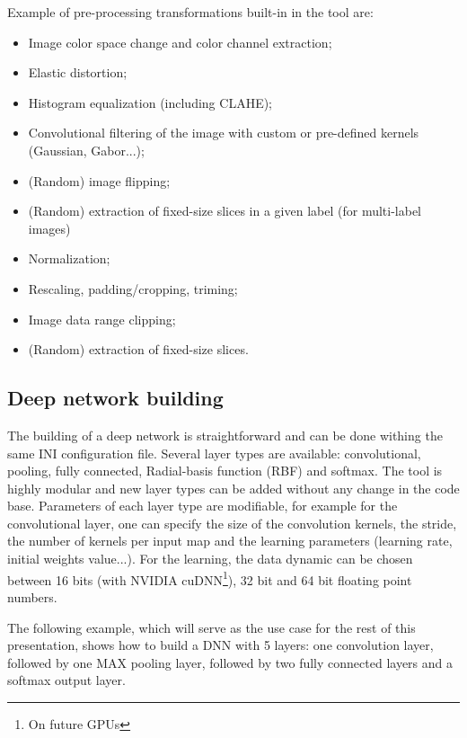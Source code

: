 \documentclass[a4paper,11pt,oneside]{article}
\newenvironment{myitemize}
{ \begin{itemize}
    \setlength{\itemsep}{0pt}
    \setlength{\parskip}{0pt}
    \setlength{\parsep}{0pt}     }
{ \end{itemize}                  }
\begin{document}
Example of pre-processing transformations built-in in the tool are:
\begin{myitemize}
    \item Image color space change and color channel extraction;
    \item Elastic distortion;
    \item Histogram equalization (including CLAHE);
    \item Convolutional filtering of the image with custom or pre-defined
    kernels (Gaussian, Gabor...);
    \item (Random) image flipping;
    \item (Random) extraction of fixed-size slices in a given label (for
    multi-label images)
    \item Normalization;
    \item Rescaling, padding/cropping, triming;
    \item Image data range clipping;
    \item (Random) extraction of fixed-size slices.
\end{myitemize}


\subsection{Deep network building}

The building of a deep network is straightforward and can be done withing the
same INI configuration file. Several layer types are available: convolutional,
pooling, fully connected, Radial-basis function (RBF) and softmax. The tool is
 highly modular and new layer types can be added without any change in the code
  base.
Parameters of each layer type are modifiable, for example for the convolutional
 layer, one can specify the size of the convolution kernels, the stride,
 the number of kernels per input map and the learning parameters (learning rate,
  initial weights value...).
For the learning, the data dynamic can be chosen between 16 bits (with
 NVIDIA\textregistered{} cuDNN\footnote{On future GPUs}), 32 bit and 64 bit
  floating point numbers.

The following example, which will serve as the use case for the rest of this
 presentation, shows how to build a DNN with 5 layers: one convolution layer,
  followed by one MAX pooling layer, followed by two fully connected layers
  and a softmax output layer.
\end{document}

